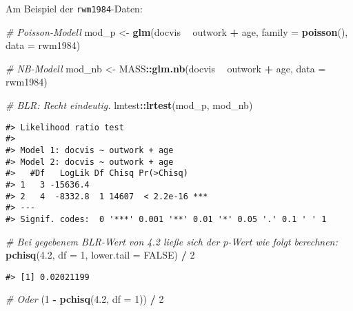\documentclass[ngerman,a4paper,]{scrartcl}
\newenvironment{Shaded}{\begin{snugshade}}{\end{snugshade}}
\newcommand{\CommentTok}[1]{\textcolor[rgb]{0.56,0.35,0.01}{\textit{#1}}}
\newcommand{\DataTypeTok}[1]{\textcolor[rgb]{0.13,0.29,0.53}{#1}}
\newcommand{\DecValTok}[1]{\textcolor[rgb]{0.00,0.00,0.81}{#1}}
\newcommand{\FloatTok}[1]{\textcolor[rgb]{0.00,0.00,0.81}{#1}}
\newcommand{\KeywordTok}[1]{\textcolor[rgb]{0.13,0.29,0.53}{\textbf{#1}}}
\newcommand{\NormalTok}[1]{#1}
\newcommand{\OperatorTok}[1]{\textcolor[rgb]{0.81,0.36,0.00}{\textbf{#1}}}
\newcommand{\OtherTok}[1]{\textcolor[rgb]{0.56,0.35,0.01}{#1}}
\newcommand{\StringTok}[1]{\textcolor[rgb]{0.31,0.60,0.02}{#1}}
\theoremstyle{definition}
\theoremstyle{definition}
\theoremstyle{definition}
\theoremstyle{remark}
\begin{document}
Am Beispiel der \texttt{rwm1984}-Daten:

\begin{Shaded}
\begin{Highlighting}[]
\CommentTok{# Poisson-Modell}
\NormalTok{mod_p <-}\StringTok{ }\KeywordTok{glm}\NormalTok{(docvis }\OperatorTok{~}\StringTok{ }\NormalTok{outwork }\OperatorTok{+}\StringTok{ }\NormalTok{age, }\DataTypeTok{family =} \KeywordTok{poisson}\NormalTok{(), }\DataTypeTok{data =}\NormalTok{ rwm1984)}

\CommentTok{# NB-Modell}
\NormalTok{mod_nb <-}\StringTok{ }\NormalTok{MASS}\OperatorTok{::}\KeywordTok{glm.nb}\NormalTok{(docvis }\OperatorTok{~}\StringTok{ }\NormalTok{outwork }\OperatorTok{+}\StringTok{ }\NormalTok{age, }\DataTypeTok{data =}\NormalTok{ rwm1984)}

\CommentTok{# BLR: Recht eindeutig.}
\NormalTok{lmtest}\OperatorTok{::}\KeywordTok{lrtest}\NormalTok{(mod_p, mod_nb)}
\end{Highlighting}
\end{Shaded}

\begin{verbatim}
#> Likelihood ratio test
#> 
#> Model 1: docvis ~ outwork + age
#> Model 2: docvis ~ outwork + age
#>   #Df   LogLik Df Chisq Pr(>Chisq)    
#> 1   3 -15636.4                        
#> 2   4  -8332.8  1 14607  < 2.2e-16 ***
#> ---
#> Signif. codes:  0 '***' 0.001 '**' 0.01 '*' 0.05 '.' 0.1 ' ' 1
\end{verbatim}

\begin{Shaded}
\begin{Highlighting}[]
\CommentTok{# Bei gegebenem BLR-Wert von 4.2 ließe sich der p-Wert wie folgt berechnen:}
\KeywordTok{pchisq}\NormalTok{(}\FloatTok{4.2}\NormalTok{, }\DataTypeTok{df =} \DecValTok{1}\NormalTok{, }\DataTypeTok{lower.tail =} \OtherTok{FALSE}\NormalTok{) }\OperatorTok{/}\StringTok{ }\DecValTok{2}
\end{Highlighting}
\end{Shaded}

\begin{verbatim}
#> [1] 0.02021199
\end{verbatim}

\begin{Shaded}
\begin{Highlighting}[]
\CommentTok{# Oder}
\NormalTok{(}\DecValTok{1} \OperatorTok{-}\StringTok{ }\KeywordTok{pchisq}\NormalTok{(}\FloatTok{4.2}\NormalTok{, }\DataTypeTok{df =} \DecValTok{1}\NormalTok{)) }\OperatorTok{/}\StringTok{ }\DecValTok{2}
\end{Highlighting}
\end{Shaded}
\end{document}
